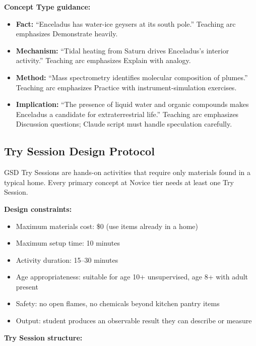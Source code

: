 \documentclass[11pt,letterpaper]{article}
\begin{document}
\textbf{Concept Type guidance:}
\begin{itemize}[leftmargin=*]
  \item \textbf{Fact:} ``Enceladus has water-ice geysers at its south pole.'' Teaching arc emphasizes Demonstrate heavily.
  \item \textbf{Mechanism:} ``Tidal heating from Saturn drives Enceladus's interior activity.'' Teaching arc emphasizes Explain with analogy.
  \item \textbf{Method:} ``Mass spectrometry identifies molecular composition of plumes.'' Teaching arc emphasizes Practice with instrument-simulation exercises.
  \item \textbf{Implication:} ``The presence of liquid water and organic compounds makes Enceladus a candidate for extraterrestrial life.'' Teaching arc emphasizes Discussion questions; Claude script must handle speculation carefully.
\end{itemize}

\subsection{Try Session Design Protocol}

GSD Try Sessions are hands-on activities that require only materials found in a typical home. Every primary concept at Novice tier needs at least one Try Session.

\textbf{Design constraints:}
\begin{itemize}[leftmargin=*]
  \item Maximum materials cost: \$0 (use items already in a home)
  \item Maximum setup time: 10 minutes
  \item Activity duration: 15--30 minutes
  \item Age appropriateness: suitable for age 10+ unsupervised, age 8+ with adult present
  \item Safety: no open flames, no chemicals beyond kitchen pantry items
  \item Output: student produces an observable result they can describe or measure
\end{itemize}

\textbf{Try Session structure:}
\end{document}
